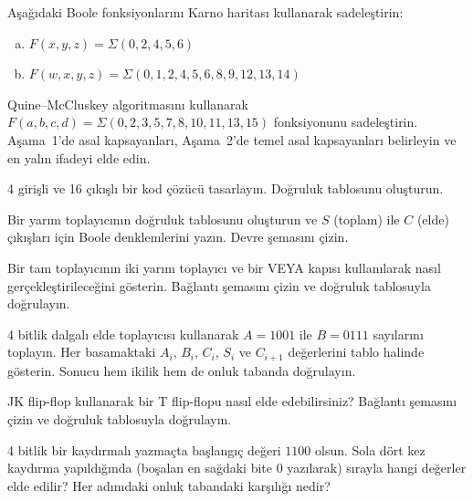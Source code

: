 \begin{alistirma}[\orta]
Aşağıdaki Boole fonksiyonlarını Karno haritası kullanarak sadeleştirin:
\begin{enumerate}[(a)]
    \item $F(x,y,z) = \Sigma(0, 2, 4, 5, 6)$
    \item $F(w,x,y,z) = \Sigma(0, 1, 2, 4, 5, 6, 8, 9, 12, 13, 14)$
\end{enumerate}
\end{alistirma}

\begin{alistirma}[\orta]
Quine--McCluskey algoritmasını kullanarak $F(a,b,c,d) = \Sigma(0, 2, 3, 5, 7, 8, 10, 11, 13, 15)$ fonksiyonunu sadeleştirin. Aşama~1'de asal kapsayanları, Aşama~2'de temel asal kapsayanları belirleyin ve en yalın ifadeyi elde edin.
\end{alistirma}

\begin{alistirma}[\orta]
4 girişli ve 16 çıkışlı bir kod çözücü tasarlayın. Doğruluk tablosunu oluşturun.
\end{alistirma}

\begin{alistirma}[\orta]
Bir yarım toplayıcının doğruluk tablosunu oluşturun ve $S$ (toplam) ile $C$ (elde) çıkışları için Boole denklemlerini yazın. Devre şemasını çizin.
\end{alistirma}

\begin{alistirma}[\orta]
Bir tam toplayıcının iki yarım toplayıcı ve bir VEYA kapısı kullanılarak nasıl gerçekleştirileceğini gösterin. Bağlantı şemasını çizin ve doğruluk tablosuyla doğrulayın.
\end{alistirma}

\begin{alistirma}[\orta]
4 bitlik dalgalı elde toplayıcısı kullanarak $A = 1001$ ile $B = 0111$ sayılarını toplayın. Her basamaktaki $A_i$, $B_i$, $C_i$, $S_i$ ve $C_{i+1}$ değerlerini tablo halinde gösterin. Sonucu hem ikilik hem de onluk tabanda doğrulayın.
\end{alistirma}

\begin{alistirma}[\orta]
JK flip-flop kullanarak bir T flip-flopu nasıl elde edebilirsiniz? Bağlantı şemasını çizin ve doğruluk tablosuyla doğrulayın.
\end{alistirma}

\begin{alistirma}[\orta]
4 bitlik bir kaydırmalı yazmaçta başlangıç değeri $1100$ olsun. Sola dört kez kaydırma yapıldığında (boşalan en sağdaki bite 0 yazılarak) sırayla hangi değerler elde edilir? Her adımdaki onluk tabandaki karşılığı nedir?
\end{alistirma}

